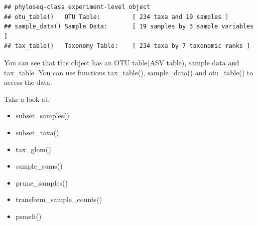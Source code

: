 \documentclass[
]{book}
\newenvironment{Shaded}{\begin{snugshade}}{\end{snugshade}}
\newcommand{\ControlFlowTok}[1]{\textcolor[rgb]{0.13,0.29,0.53}{\textbf{#1}}}
\newcommand{\DataTypeTok}[1]{\textcolor[rgb]{0.13,0.29,0.53}{#1}}
\newcommand{\FloatTok}[1]{\textcolor[rgb]{0.00,0.00,0.81}{#1}}
\newcommand{\KeywordTok}[1]{\textcolor[rgb]{0.13,0.29,0.53}{\textbf{#1}}}
\newcommand{\NormalTok}[1]{#1}
\newcommand{\OperatorTok}[1]{\textcolor[rgb]{0.81,0.36,0.00}{\textbf{#1}}}
\newcommand{\StringTok}[1]{\textcolor[rgb]{0.31,0.60,0.02}{#1}}
\providecommand{\tightlist}{%
  \setlength{\itemsep}{0pt}\setlength{\parskip}{0pt}}
\begin{document}
\begin{verbatim}
## phyloseq-class experiment-level object
## otu_table()   OTU Table:         [ 234 taxa and 19 samples ]
## sample_data() Sample Data:       [ 19 samples by 3 sample variables ]
## tax_table()   Taxonomy Table:    [ 234 taxa by 7 taxonomic ranks ]
\end{verbatim}

You can see that this object has an OTU table(ASV table), sample data and tax\_table. You can use functions tax\_table(), sample\_data() and otu\_table() to access the data.

Take a look at:

\begin{itemize}
\tightlist
\item
  subset\_samples()
\item
  subset\_taxa()
\item
  tax\_glom()
\item
  sample\_sums()
\item
  prune\_samples()
\item
  transform\_sample\_counts()
\item
  psmelt()
\end{itemize}

\begin{Shaded}
\end{Shaded}
\end{document}
